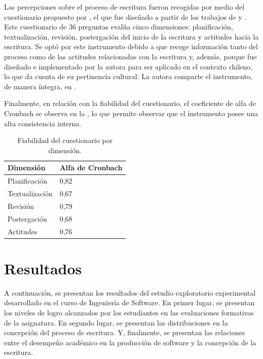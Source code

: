 \documentclass[spanish]{textolivre}
\begin{document}
Las percepciones sobre el proceso de escritura fueron recogidas por medio del cuestionario propuesto por \textcite{vine2020escritura}, el que fue diseñado a partir de los trabajos de \textcite{de2012hacia} y \textcite{rodriguez2015escritura}. 
Este cuestionario de 36 preguntas evalúa cinco dimensiones: planificación, textualización, revisión, postergación del inicio de la escritura y actitudes hacia la escritura. Se optó por este instrumento debido a que recoge información tanto del proceso como de las actitudes relacionadas con la escritura y, además, porque fue diseñado e implementado por la autora para ser aplicado en el contexto chileno, lo que da cuenta de su pertinencia cultural. La autora comparte el instrumento, de manera íntegra, en \cite{vine2020escritura}.%

Finalmente, en relación con la fiabilidad del cuestionario, el coeficiente de alfa de Cronbach se observa en la , lo que permite observar que el instrumento posee una alta consistencia interna.

\begin{table}[htpb]
\centering
\begin{threeparttable}
\caption{Fiabilidad del cuestionario por dimensión.}
\label{fiabilidad}
\begin{tabular}{ll}
\toprule 
Dimensión & Alfa de Cronbach \\ 
\midrule
Planificación & 0,82\\
Textualización & 0,67\\
Revisión & 0,79\\
Postergación & 0,68\\
Actitudes & 0,76\\
\bottomrule
\end{tabular}
\end{threeparttable}
\end{table}

\section{Resultados}

A continuación, se presentan los resultados del estudio exploratorio experimental desarrollado en el curso de Ingeniería de Software. En primer lugar, se presentan los niveles de logro alcanzados por los estudiantes en las evaluaciones formativas de la asignatura. En segundo lugar, se presentan las distribuciones en la concepción del proceso de escritura. Y, finalmente, se presentan las relaciones entre el desempeño académico en la producción de software y la concepción de la escritura.
\end{document}
